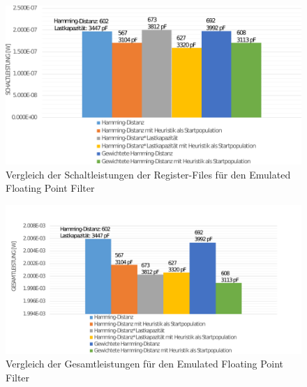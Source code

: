 \begin{figure}[H]
	\centering
	\includegraphics[width=\textwidth]{fig/filter_schaltleistung_vergleich.pdf}
	\caption{Vergleich der Schaltleistungen der Register-Files f\"ur den Emulated Floating Point Filter}
	\label{fig:filter_schaltleistung_vergleich}
\end{figure}

\begin{figure}[H]
	\centering
	\includegraphics[width=\textwidth]{fig/filter_gesamtleistung_vergleich.pdf}
	\caption{Vergleich der Gesamtleistungen f\"ur den Emulated Floating Point Filter }
	\label{fig:filter_gesamtleistung_vergleich}
\end{figure}


